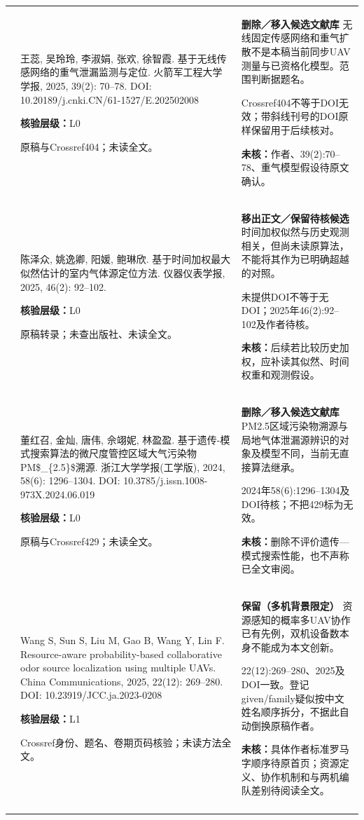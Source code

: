 \begin{longtable}{@{}>{\raggedright\arraybackslash}p{0.7cm}>{\raggedright\arraybackslash}p{7.0cm}>{\raggedright\arraybackslash}p{7.8cm}@{}}
25 & 王蕊, 吴玲玲, 李淑娟, 张欢, 徐智霞. 基于无线传感网络的重气泄漏监测与定位. 火箭军工程大学学报, 2025, 39(2): 70–78. DOI: 10.20189/j.cnki.CN/61-1527/E.202502008\par\textbf{核验层级：}L0\par 原稿与Crossref404；未读全文。 & \textbf{删除／移入候选文献库} 无线固定传感网络和重气扩散不是本稿当前同步UAV测量与已资格化模型。范围判断据题名。\par Crossref404不等于DOI无效；带斜线刊号的DOI原样保留用于后续核对。\par\textbf{未核：}作者、39(2):70–78、重气模型假设待原文确认。 \\\addlinespace[6pt]
26 & 陈泽众, 姚逸卿, 阳媛, 鲍琳欣. 基于时间加权最大似然估计的室内气体源定位方法. 仪器仪表学报, 2025, 46(2): 92–102.\par\textbf{核验层级：}L0\par 原稿转录；未查出版社、未读全文。 & \textbf{移出正文／保留待核候选} 时间加权似然与历史观测相关，但尚未读原算法，不能将其作为已明确超越的对照。\par 未提供DOI不等于无DOI；2025年46(2):92–102及作者待核。\par\textbf{未核：}后续若比较历史加权，应补读其似然、时间权重和观测假设。 \\\addlinespace[6pt]
27 & 董红召, 金灿, 唐伟, 佘翊妮, 林盈盈. 基于遗传-模式搜索算法的微尺度管控区域大气污染物PM\$\_\{2.5\}\$溯源. 浙江大学学报(工学版), 2024, 58(6): 1296–1304. DOI: 10.3785/j.issn.1008-973X.2024.06.019\par\textbf{核验层级：}L0\par 原稿与Crossref429；未读全文。 & \textbf{删除／移入候选文献库} PM2.5区域污染物溯源与局地气体泄漏源辨识的对象及模型不同，当前无直接算法继承。\par 2024年58(6):1296–1304及DOI待核；不把429标为无效。\par\textbf{未核：}删除不评价遗传—模式搜索性能，也不声称已全文审阅。 \\\addlinespace[6pt]
28 & Wang S, Sun S, Liu M, Gao B, Wang Y, Lin F. Resource-aware probability-based collaborative odor source localization using multiple UAVs. China Communications, 2025, 22(12): 269–280. DOI: 10.23919/JCC.ja.2023-0208\par\textbf{核验层级：}L1\par Crossref身份、题名、卷期页码核验；未读方法全文。 & \textbf{保留（多机背景限定）} 资源感知的概率多UAV协作已有先例，双机设备数本身不能成为本文创新。\par 22(12):269–280、2025及DOI一致。登记given/family疑似按中文姓名顺序拆分，不据此自动倒换原稿作者。\par\textbf{未核：}具体作者标准罗马字顺序待原首页；资源定义、协作机制和与两机编队差别待阅读全文。 \\\addlinespace[6pt]

\end{longtable}
